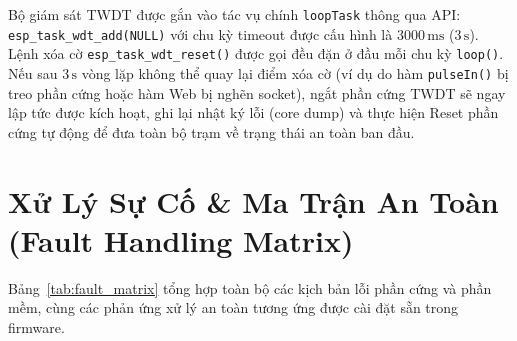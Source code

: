 Bộ giám sát TWDT được gắn vào tác vụ chính \texttt{loopTask} thông qua API:
\newline
\texttt{esp\_task\_wdt\_add(NULL)}
\newline
với chu kỳ timeout được cấu hình là $3000\,\text{ms}$ ($3\,\text{s}$). Lệnh xóa cờ \texttt{esp\_task\_wdt\_reset()} được gọi đều đặn ở đầu mỗi chu kỳ \texttt{loop()}. Nếu sau $3\,\text{s}$ vòng lặp không thể quay lại điểm xóa cờ (ví dụ do hàm \texttt{pulseIn()} bị treo phần cứng hoặc hàm Web bị nghẽn socket), ngắt phần cứng TWDT sẽ ngay lập tức được kích hoạt, ghi lại nhật ký lỗi (core dump) và thực hiện Reset phần cứng tự động để đưa toàn bộ trạm về trạng thái an toàn ban đầu.

\section{Xử Lý Sự Cố \& Ma Trận An Toàn (Fault Handling Matrix)}

Bảng~\ref{tab:fault_matrix} tổng hợp toàn bộ các kịch bản lỗi phần cứng và phần mềm, cùng các phản ứng xử lý an toàn tương ứng được cài đặt sẵn trong firmware.

